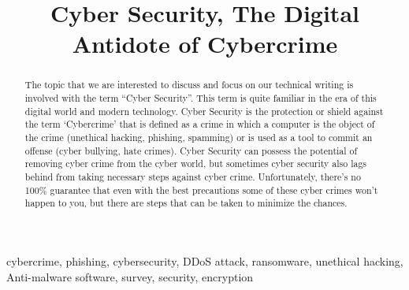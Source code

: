 \documentclass[conference,double column]{IEEEtran}
\begin{document}
	\title{Cyber Security, The Digital Antidote of Cybercrime}
	\author{}
	
	\maketitle

	
	\begin{abstract}
		The topic that we are interested to discuss and focus on our technical writing is involved with the term “Cyber Security”. This term is quite familiar in the era of this digital world and modern technology. Cyber Security is the protection or shield against the term ‘Cybercrime’ that is defined as a crime in which a computer is the object of the crime (unethical hacking, phishing, spamming) or is used as a tool to commit an offense (cyber bullying, hate crimes). Cyber Security can possess the potential of removing cyber crime from the cyber world, but sometimes cyber security also lags behind from taking necessary steps against cyber crime. Unfortunately, there's no 100\% guarantee that even with the best precautions some of these cyber crimes won't happen to you, but there are steps that can be taken to minimize the chances.
	\end{abstract}

	\begin{IEEEkeywords}
		cybercrime, phishing, cybersecurity, DDoS attack, ransomware, unethical hacking, Anti-malware software, survey, security, encryption
	\end{IEEEkeywords}
\end{document}
